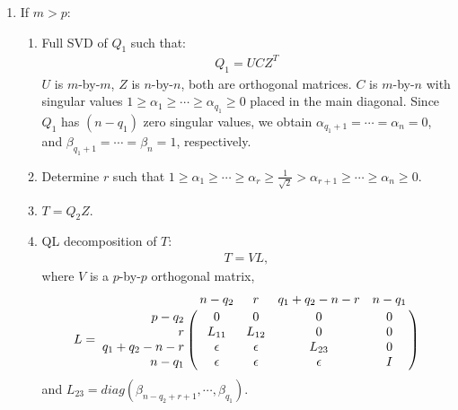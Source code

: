 \begin{enumerate}
        \item If $m > p$:
            \begin{enumerate}
                \item Full SVD of $Q_1$ such that:
                    \begin{align}
                        Q_1 = UCZ^{T}
                    \end{align}
                    $U$ is $m$-by-$m$, $Z$ is $n$-by-$n$, both are orthogonal matrices. $C$ is $m$-by-$n$ with singular values $1 \geq \alpha_1 \geq \cdots \geq \alpha_{q_1} \geq 0$ placed in the main diagonal. Since $Q_1$ has $(n-q_1)$ zero singular values, we obtain $\alpha_{q_1+1} = \cdots = \alpha_{n} = 0$, and $\beta_{q_1+1} = \cdots = \beta_{n} = 1$, respectively. 
                \item Determine $r$ such that $1 \geq \alpha_{1} \geq \cdots \geq \alpha_{r} \geq \frac{1}{\sqrt{2}} > \alpha_{r+1} \geq \cdots \geq \alpha_{n} \geq 0$. 
                \item $T = Q_2Z$.
                \item QL decomposition of $T$:
                    \begin{align}
                        T = VL,
                    \end{align}
                    where $V$ is a $p$-by-$p$ orthogonal matrix, 
                    \begin{equation} \label{eq-L-block-case2}
                        L = \bordermatrix{ & n-q_2 & r & q_1+q_2-n-r & n-q_1 \cr
                                    \hfill p-q_2 & 0 & 0 & 0 & 0 \cr
                                    \hfill r & L_{11} & L_{12} & 0 & 0 \cr
                                    \hfill q_1+q_2-n-r & \epsilon & \epsilon & L_{23} & 0 \cr
                                    \hfill n-q_1 & \epsilon & \epsilon & \epsilon & I}
                    \end{equation}
                    and $L_{23} = diag(\beta_{n-q_2+r+1}, \cdots, \beta_{q_1})$.
                

\end{enumerate}
\end{enumerate}
